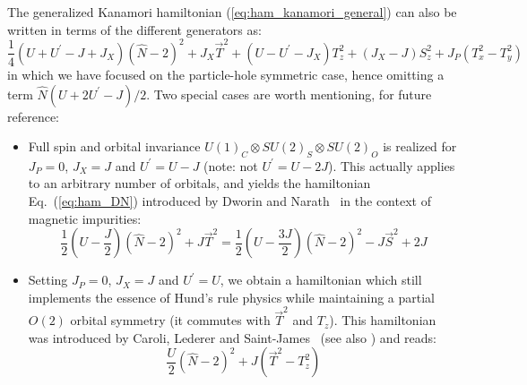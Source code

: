 \documentclass[]{ar2e-changed}%
\def\Up{U^\prime}
\def\hN{\hat{N}}
\begin{document}
\begin{small}
\begin{equation}
\label{eq:slater_eg}
\end{equation}
%
The generalized Kanamori hamiltonian (\ref{eq:ham_kanamori_general}) can also be written in terms of the 
different generators as: 
\begin{equation}
\frac{1}{4}(U+\Up-J+J_X)(\hN-2)^2+J_X\vec{T}^2+(U-\Up-J_X)T_z^2+(J_X-J)S_z^2+J_P(T_x^2-T_y^2)
\end{equation}
in which we have focused on the particle-hole symmetric case, hence omitting a term $\hN(U+2\Up-J)/2$.
%
%  
Two special cases are worth mentioning, for future reference:
\begin{itemize}
\item Full spin and orbital invariance $U(1)_C\otimes SU(2)_S\otimes SU(2)_O$ is realized for $J_P=0$, $J_X=J$ and 
$\Up=U-J$ (note: not $\Up=U-2J$). This actually applies to an arbitrary number of orbitals, and yields the  
hamiltonian Eq.~(\ref{eq:ham_DN}) introduced by Dworin and Narath~\cite{dworin_prl_1970} 
in the context of magnetic impurities:
\begin{equation}
\frac{1}{2}(U-\frac{J}{2})(\hN-2)^2+J\vec{T}^2=\frac{1}{2}(U-\frac{3J}{2})(\hN-2)^2-J\vec{S}^2+2J
\label{eq:ham_dworin_2orbital}
\end{equation}
 \item Setting $J_P=0$, $J_X=J$ and $\Up=U$, we obtain a hamiltonian which still implements the essence of Hund's rule 
 physics while maintaining a partial $O(2)$ orbital symmetry (it commutes with $\vec{T}^2$ and $T_z$). 
 This hamiltonian was introduced by Caroli, Lederer and Saint-James~\cite{caroli_hund_prl_1969} 
 (see also \cite{deleo_2orbital_impurity_prb_2004,leo04thesis}) and reads: 
\begin{equation}
\frac{U}{2} (\hN-2)^2 + J(\vec{T}^2-T_z^2)
\end{equation} 
\end{itemize}

\end{small}

\end{document}

